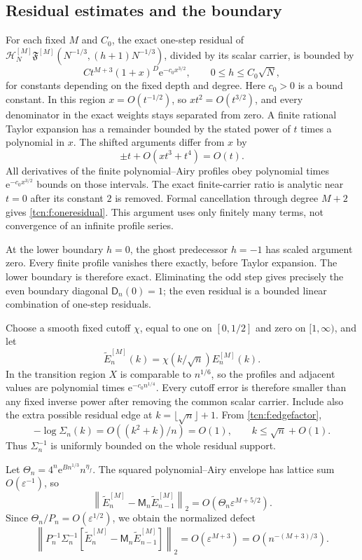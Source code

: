 \documentclass[11pt,letterpaper]{article}
\newcommand{\norm}[1]{\left\lVert#1\right\rVert}
\newcommand{\eps}{\varepsilon}
\newcommand{\ee}{\mathrm e}
\theoremstyle{remark}
\begin{document}
\subsection{Residual estimates and the boundary}
For each fixed $M$ and $C_0$, the exact one-step residual of
$\mathcal H_N^{[M]}\mathfrak F^{[M]}(N^{-1/3},(h+1)N^{-1/3})$, divided by its scalar carrier, is bounded by
\begin{equation}\label{tcn:f:oneresidual}
 C t^{M+3}(1+x)^D\ee^{-c_0x^{3/2}},\qquad 0\le h\le C_0\sqrt N,
\end{equation}
for constants depending on the fixed depth and degree. Here $c_0>0$ is a bound constant. In this region $x=O(t^{-1/2})$, so $xt^2=O(t^{3/2})$, and every denominator in the exact weights stays separated from zero. A finite rational Taylor expansion has a remainder bounded by the stated power of $t$ times a polynomial in $x$. The shifted arguments differ from $x$ by
\[
 \pm t+O(xt^3+t^4)=O(t).
\]
All derivatives of the finite polynomial--Airy profiles obey polynomial times $\ee^{-c_0x^{3/2}}$ bounds on those intervals. The exact finite-carrier ratio is analytic near $t=0$ after its constant $2$ is removed. Formal cancellation through degree $M+2$ gives \eqref{tcn:f:oneresidual}. This argument uses only finitely many terms, not convergence of an infinite profile series.

At the lower boundary $h=0$, the ghost predecessor $h=-1$ has scaled argument zero. Every finite profile vanishes there exactly, before Taylor expansion. The lower boundary is therefore exact. Eliminating the odd step gives precisely the even boundary diagonal $\mathsf D_n(0)=1$; the even residual is a bounded linear combination of one-step residuals.

Choose a smooth fixed cutoff $\chi$, equal to one on $[0,1/2]$ and zero on $[1,\infty)$, and let
\[
 \widetilde E_n^{[M]}(k)=\chi(k/\sqrt n)E_n^{[M]}(k).
\]
In the transition region $X$ is comparable to $n^{1/6}$, so the profiles and adjacent values are polynomial times $\ee^{-c_0n^{1/4}}$. Every cutoff error is therefore smaller than any fixed inverse power after removing the common scalar carrier. Include also the extra possible residual edge at $k=\lfloor\sqrt n\rfloor+1$. From \eqref{tcn:f:edgefactor},
\[
 -\log \Sigma_n(k)=O((k^2+k)/n)=O(1),\qquad k\le\sqrt n+O(1).
\]
Thus $\Sigma_n^{-1}$ is uniformly bounded on the whole residual support.

Let $\Theta_n=4^n\ee^{Bn^{1/3}}n^{\eta_f}$. The squared polynomial--Airy envelope has lattice sum $O(\eps^{-1})$, so
\[
 \norm{\widetilde E_n^{[M]}-\mathsf M_n\widetilde E_{n-1}^{[M]}}_2
 =O(\Theta_n\eps^{M+5/2}).
\]
Since $\Theta_n/P_n=O(\eps^{1/2})$, we obtain the normalized defect
\begin{equation}\label{tcn:f:normalizeddefect}
 \norm{P_n^{-1}\Sigma_n^{-1}
  [\widetilde E_n^{[M]}-\mathsf M_n\widetilde E_{n-1}^{[M]}]}_2
 =O(\eps^{M+3})=O(n^{-(M+3)/3}).
\end{equation}
\end{document}
